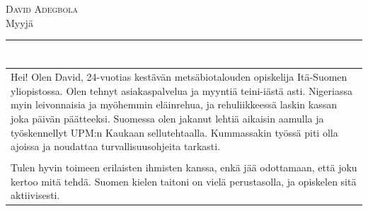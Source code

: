 \documentclass[a4paper,11pt]{article}
\begin{document}
\begin{cvheader}
\par{\centering
		{\Huge \textsc{David Adegbola}}\\[0.4em]
		{\Large Myyjä}
	\bigskip\par}

\hrule
\vspace{0.5em}
\end{cvheader}

\section{}
\begin{tabular}{p{}}
 Hei! Olen David, 24-vuotias kestävän metsäbiotalouden opiskelija Itä-Suomen yliopistossa. Olen tehnyt asiakaspalvelua ja myyntiä teini-iästä asti. Nigeriassa myin leivonnaisia ja myöhemmin eläinrehua, ja rehuliikkeessä laskin kassan joka päivän päätteeksi. Suomessa olen jakanut lehtiä aikaisin aamulla ja työskennellyt UPM:n Kaukaan sellutehtaalla. Kummassakin työssä piti olla ajoissa ja noudattaa turvallisuusohjeita tarkasti.\\\\

 Tulen hyvin toimeen erilaisten ihmisten kanssa, enkä jää odottamaan, että joku kertoo mitä tehdä. Suomen kielen taitoni on vielä perustasolla, ja opiskelen sitä aktiivisesti.
\end{tabular}

\section{}
\end{document}
